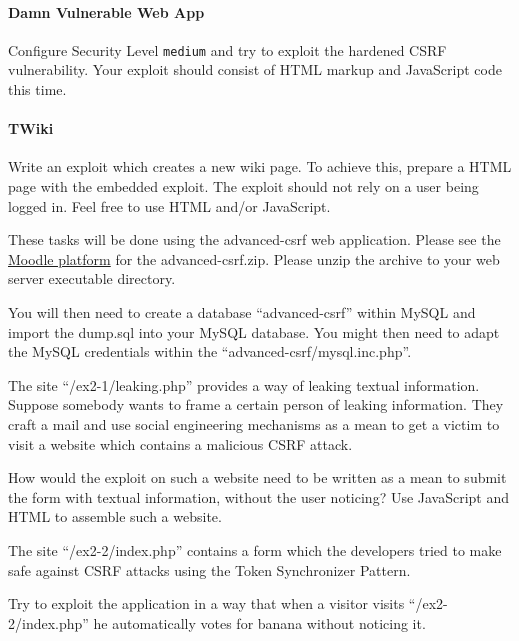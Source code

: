 \documentclass{./handout}
\begin{document}
\begin{subtask}
\paragraph{Damn Vulnerable Web App}
Configure Security Level \texttt{medium} and try to exploit the hardened 
CSRF vulnerability.
Your exploit should consist of HTML markup and JavaScript code this time.
\end{subtask}

\begin{subtask}
\paragraph{TWiki}
Write an exploit which creates a new wiki page. To achieve this, prepare 
a HTML page with the embedded exploit. The exploit should not rely on 
a user being logged in. Feel free to use HTML and/or JavaScript.
\end{subtask}

\newpage
{}
These tasks will be done using the advanced-csrf web application.
Please see the 
\href{https://moodle.uni-ulm.de/course/view.php?id=1312}{Moodle platform} for 
the advanced-csrf.zip. Please unzip the archive to your web server executable
directory.

You will then need to create a database ``advanced-csrf'' within MySQL and 
import the dump.sql into your MySQL database.
You might then need to adapt the MySQL credentials within the
``advanced-csrf/mysql.inc.php''.

\begin{subtask}
The site ``/ex2-1/leaking.php'' provides a way of leaking textual information.
Suppose somebody wants to frame a certain person of leaking information.
They craft a mail and use social engineering mechanisms as a mean to
get a victim to visit a website which contains a malicious CSRF attack.

How would the exploit on such a website need to be written as a mean
to submit the form with textual information, without the user noticing?
Use JavaScript and HTML to assemble such a website.
\end{subtask}

\begin{subtask}
The site ``/ex2-2/index.php'' contains a form which the developers tried to
make safe against CSRF attacks using the Token Synchronizer Pattern.

Try to exploit the application in a way that when a visitor visits 
``/ex2-2/index.php'' he automatically votes for banana without noticing it.
\end{subtask}
\end{document}
